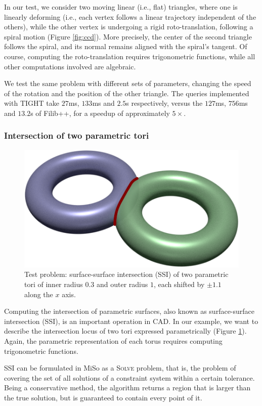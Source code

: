 In our test, we consider two moving linear (i.e., flat) triangles, where one is linearly deforming (i.e., each vertex follows a linear trajectory independent of the others), while the other vertex is undergoing a rigid roto-translation, following a spiral motion (Figure \ref{fig:ccd}).
More precisely, the center of the second triangle follows the spiral, and its normal remains aligned with the spiral's tangent. 
Of course, computing the roto-translation requires trigonometric functions, while all other computations involved are algebraic.

We test the same problem with different sets of parameters, changing the speed of the rotation and the position of the other triangle. The queries implemented with TIGHT take $27$ms, $133$ms and $2.5$s respectively, versus the $127$ms, $756$ms and $13.2$s of Filib++, for a speedup of approximately $5\times$.

\subsubsection{Intersection of two parametric tori}
\begin{figure}
	\centering
	\includegraphics[width=0.8\linewidth]{fig/torusInt.png}
	\caption{Test problem: surface-surface intersection (SSI) of two parametric tori of inner radius $0.3$ and outer radius $1$, each shifted by $\pm1.1$ along the $x$ axis.}
	\label{fig:tori}
\end{figure}
Computing the intersection of parametric surfaces, also known as surface-surface intersection (SSI), is an important operation in CAD.
In our example, we want to describe the intersection locus of two tori expressed parametrically (Figure \ref{fig:tori}).
Again, the parametric representation of each torus requires computing trigonometric functions.

SSI can be formulated in MiSo as a \textsc{Solve} problem, that is, the problem of covering the set of all solutions of a constraint system within a certain tolerance.
Being a conservative method, the algorithm returns a region that is larger than the true solution, but is guaranteed to contain every point of it.

